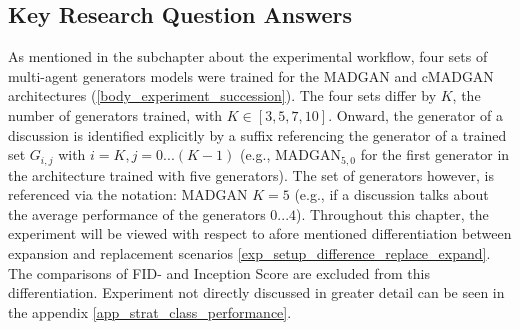 \subsection{Key Research Question Answers}
As mentioned in the subchapter about the experimental workflow, four sets of multi-agent generators models were trained  for the MADGAN and cMADGAN architectures (\ref{body_experiment_succession}). The four sets differ by \(K\), the number of generators trained, with \(K \in [3, 5, 7, 10]\). Onward, the generator of a discussion is identified explicitly by a suffix referencing the generator of a trained set \(G_{i, j}\) with \(i=K, j=0...(K-1)\) (e.g., \(\text{MADGAN}_{5, 0}\) for the first generator in the architecture trained with five generators). The set of generators however, is referenced via the notation: MADGAN \(K=5\) (e.g., if a discussion talks about the average performance of the generators \(0...4\)). Throughout this chapter, the experiment will be viewed with respect to afore mentioned differentiation between expansion and replacement scenarios \ref{exp_setup_difference_replace_expand}. The comparisons of FID- and Inception Score are excluded from this differentiation. Experiment not directly discussed in greater detail can be seen in the appendix \ref{app_strat_class_performance}.


